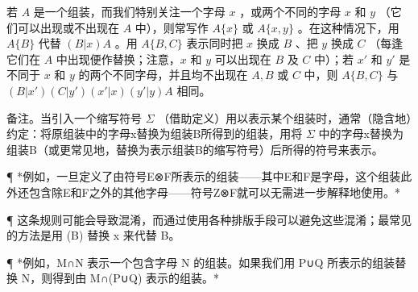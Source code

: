 若 \(A\) 是一个组装，而我们特别关注一个字母 \(x\) ，或两个不同的字母 \(x\) 和 \(y\) （它们可以出现或不出现在 \(A\) 中），则常写作 \(A \{x\}\) 或 \(A \{x, y\}\) 。在这种情况下，用 \(A \{B\}\) 代替 \((B|x)A\) 。用 \(A \{B, C\}\) 表示同时把 \(x\) 换成 \(B\) 、把 \(y\) 换成 \(C\) （每逢它们在 \(A\) 中出现便作替换；注意，\(x\) 和 \(y\) 可以出现在 \(B\) 及 \(C\) 中）；若 \(x'\) 和 \(y'\) 是不同于 \(x\) 和 \(y\) 的两个不同字母，并且均不出现在 \(A, B\) 或 \(C\) 中，则 \(A \{B, C\}\) 与 \((B|x') (C|y') (x'|x) (y'|y)A\) 相同。

备注。当引入一个缩写符号 \(\Sigma\) （借助定义）用以表示某个组装时，通常（隐含地）约定：将原组装中的字母x替换为组装B所得到的组装，用将 \(\Sigma\) 中的字母x替换为组装B（或更常见地，替换为表示组装B的缩写符号）后所得的符号来表示。

¶ *例如，一旦定义了由符号E⊗F所表示的组装——其中E和F是字母，这个组装此外还包含除E和F之外的其他字母——符号Z⊗F就可以无需进一步解释地使用。*

¶ 这条规则可能会导致混淆，而通过使用各种排版手段可以避免这些混淆；最常见的方法是用 (B) 替换 x 来代替 B。

¶ *例如，M∩N 表示一个包含字母 N 的组装。如果我们用 P∪Q 所表示的组装替换 N，则得到由 M∩(P∪Q) 表示的组装。*

